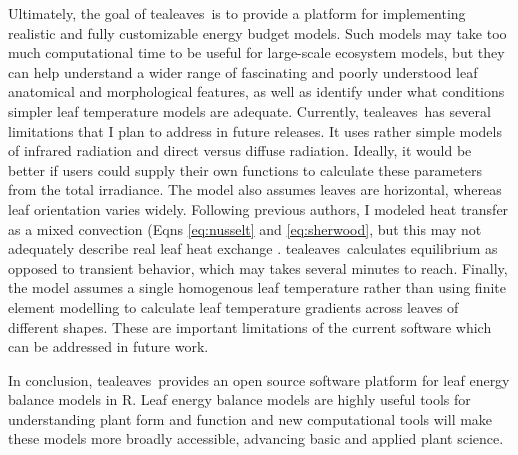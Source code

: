 \documentclass[11pt, oneside]{article}
\newcommand{\pkg}[1]{{\fontseries{b}\selectfont #1}}
\newcommand{\tealeaves}{\pkg{tealeaves}}
\begin{document}
Ultimately, the goal of \tealeaves~is to provide a platform for implementing realistic and fully customizable energy budget models. Such models may take too much computational time to be useful for large-scale ecosystem models, but they can help understand a wider range of fascinating and poorly understood leaf anatomical and morphological features, as well as identify under what conditions simpler leaf temperature models are adequate. Currently, \tealeaves~has several limitations that I plan to address in future releases. It uses rather simple models of infrared radiation and direct versus diffuse radiation. Ideally, it would be better if users could supply their own functions to calculate these parameters from the total irradiance. The model also assumes leaves are horizontal, whereas leaf orientation varies widely. Following previous authors, I modeled heat transfer as a mixed convection (Eqns \ref{eq:nusselt} and \ref{eq:sherwood}, but this may not adequately describe real leaf heat exchange \citep{Roth-Nebelsick_2001}. \tealeaves~calculates equilibrium as opposed to transient behavior, which may takes several minutes to reach. Finally, the model assumes a single homogenous leaf temperature rather than using finite element modelling to calculate leaf temperature gradients across leaves of different shapes. These are important limitations of the current software which can be addressed in future work.

In conclusion, \tealeaves~provides an open source software platform for leaf energy balance models in R. Leaf energy balance models are highly useful tools for understanding plant form and function and new computational tools will make these models more broadly accessible, advancing basic and applied plant science.





\clearpage

\end{document}

